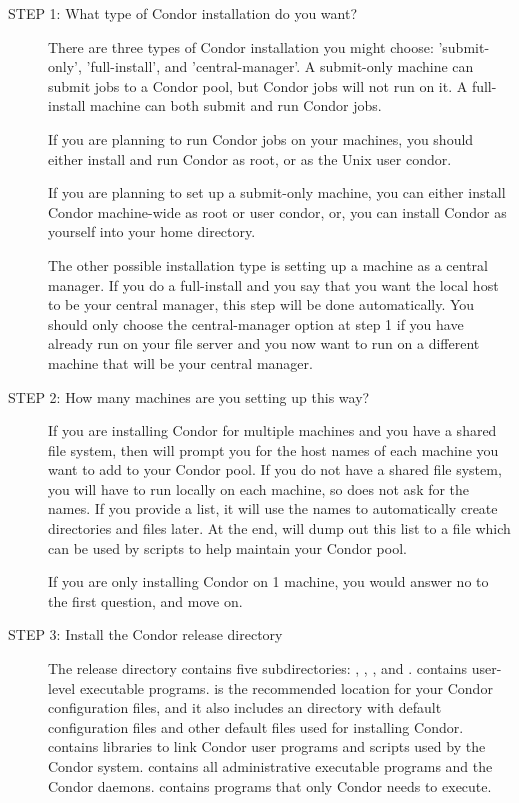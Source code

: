 \begin{description}
\item[STEP 1: What type of Condor installation do you want?]

     There are three types of Condor installation you might choose:
     'submit-only', 'full-install', and 'central-manager'.  A
     submit-only machine can submit jobs to a Condor pool, but Condor
     jobs will not run on it.  A full-install machine can both submit
     and run Condor jobs.  

     If you are planning to run Condor jobs on your machines, you
     should either install and run Condor as root, or as the Unix
     user condor.  

     If you are planning to set up a submit-only machine, you can
     either install Condor machine-wide as root or user condor, or,
     you can install Condor as yourself into your home directory.

     The other possible installation type is setting up a machine as a
     central manager.  If you do a full-install and you say that you
     want the local host to be your central manager, this step will be
     done automatically.  You should only choose the central-manager
     option at step 1 if you have already run  on your
     file server and you now want to run  on a different
     machine that will be your central manager.

\item[STEP 2: How many machines are you setting up this way?]

     If you are installing Condor for multiple machines and you have
     a shared file system, then  will prompt you for the
     host names of each machine you want to add to your Condor pool.
     If you do not have a shared file system, you will have to run
      locally on each machine, so 
     does not
     ask for the names.  If you provide a list, it will
     use the names to automatically create directories and files
     later.  At the end,  will dump out this list to a
      file which can be used by scripts to help maintain your
     Condor pool.

     If you are only installing Condor on 1 machine, you would
     answer no to the first question, and move on.

\item[STEP 3: Install the Condor release directory] 
     The release directory contains five subdirectories: 
     , ,
     ,  and .  
      contains user-level executable programs.
      is the recommended location for your Condor configuration
     files, and
     it also includes an  directory with default
     configuration files
     and other default files used for installing Condor.   contains
     libraries to link Condor user programs and scripts used by the
     Condor system.   contains all administrative executable
     programs and the Condor daemons.   contains
     programs that only Condor needs to execute.


\end{description}
